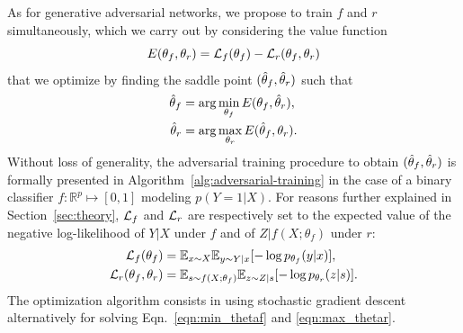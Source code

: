 \documentclass[twocolumn,superscriptaddress,aps]{revtex4-1}
\theoremstyle{plain}
\begin{document}
As for generative adversarial networks, we propose to
train $f$ and $r$ simultaneously, which we carry out by considering
the value function
\begin{equation}
    E(\theta_f, \theta_r) = {\cal L}_f(\theta_f) - {\cal L}_r(\theta_f, \theta_r)
\end{equation}
that we optimize by finding the saddle point $(\smash{\hat\theta_f}, \smash{\hat\theta_r})$ such that
\begin{align}
    \smash{\hat\theta_f} &= \arg \min_{\theta_f} E(\theta_f, \smash{\hat\theta_r}), \label{eqn:min_thetaf} \\
    \smash{\hat\theta_r} &= \arg \max_{\theta_r} E(\smash{\hat\theta_f}, \theta_r) \label{eqn:max_thetar}.
\end{align}
Without loss of generality, the adversarial training procedure to obtain
$(\smash{\hat\theta_f}, \smash{\hat\theta_r})$ is formally presented in
Algorithm~\ref{alg:adversarial-training} in the case of a binary classifier $f :
\mathbb{R}^p \mapsto [0,1]$ modeling $p(Y=1|X)$. For reasons further explained
in Section~\ref{sec:theory}, ${\cal L}_f$ and ${\cal L}_r$  are respectively set to the
expected value of the
negative log-likelihood of $Y|X$ under $f$ and of $Z|f(X;\theta_f)$ under
$r$:
\begin{align}
    {\cal L}_f(\theta_f) &= \mathbb{E}_{x \sim X}  \mathbb{E}_{y \sim Y|x} [ -\log p_{\theta_f} (y|x) ], \\
    {\cal L}_r(\theta_f, \theta_r) &= \mathbb{E}_{s \sim f(X;\theta_f)}  \mathbb{E}_{z \sim Z|s} [-\log p_{\theta_r} (z|s)].
\end{align}
The optimization algorithm consists in using stochastic gradient descent
alternatively for solving Eqn.~\ref{eqn:min_thetaf} and \ref{eqn:max_thetar}.
\end{document}
